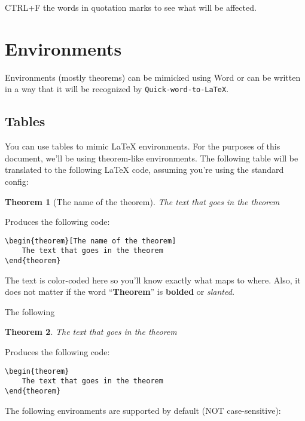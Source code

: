 \documentclass[
]{article}
\theoremstyle{plain}
\newtheorem{theorem}{Theorem}[section]
\theoremstyle{remark}
\theoremstyle{definition}
\begin{document}
CTRL+F the words in quotation marks to see what will be affected.


\section{Environments}

Environments (mostly theorems) can be mimicked using Word or can be
written in a way that it will be recognized by
\texttt{Quick-word-to-LaTeX}.


\subsection{Tables}

You can use tables to mimic LaTeX environments. For the purposes of this
document, we'll be using theorem-like environments. The following table
will be translated to the following LaTeX code, assuming you're using
the standard config:

\begin{theorem}[The name of the theorem]

The text that goes in the theorem
\end{theorem}

Produces the following code:

\begin{verbatim}
\begin{theorem}[The name of the theorem]
    The text that goes in the theorem
\end{theorem}
\end{verbatim}

The text is color-coded here so you'll know exactly what maps to where.
Also, it does not matter if the word ``\textbf{Theorem}'' is
\textbf{bolded} or \emph{slanted.}

The following

\begin{theorem}

The text that goes in the theorem
\end{theorem}

Produces the following code:

\begin{verbatim}
\begin{theorem}
    The text that goes in the theorem
\end{theorem}
\end{verbatim}

The following environments are supported by default (NOT
case-sensitive):
\end{document}
